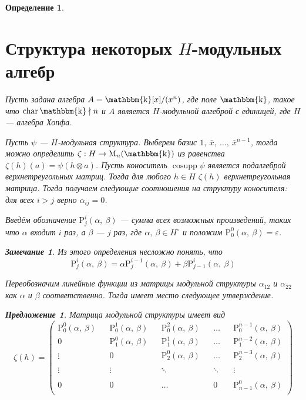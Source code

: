 \documentclass[12pt, reqno, a4paper, oneside, notitlepage]{amsart}
\theoremstyle{mytheoremstyle}
\newtheorem{proposition}[theorem]{Предложение}
\theoremstyle{myremarkstyle}
\newtheorem{remark}[theorem]{Замечание}
\newtheorem{definition}[theorem]{Определение}
\numberwithin{equation}{section}
\DeclareMathOperator{\chr}{char}
\DeclareMathOperator{\cosupp}{cosupp}
\DeclareMathOperator{\fld}{\mathbbm{k}}
\begin{document}
\begin{definition}
\newpage

\section{Структура некоторых \texorpdfstring{$H$}{H}-модульных алгебр}

Пусть задана алгебра $A = \fld[x]/(x^n)$, где поле $\fld$, такое что $\chr \fld \nmid n$ и $A$ является $H$-модульной алгеброй с единицей, где $H$ --- алгебра Хопфа.

Пусть $\psi$ --- $H$-модульная структура. Выберем базис $1,\ \bar x,\ \dots,\ \bar x^{n-1}$, тогда можно определить $\zeta: H \to \mathrm{M}_n(\fld)$ из равенства
$\zeta(h)(a) = \psi(h \otimes a)$. 
Пусть коноситель $\cosupp \psi$ является подалгеброй верхнетреугольных матриц. Тогда для любого $h \in H$ $\zeta(h)$ верхнетреугольная матрица.
Тогда получаем следующие соотношения на структуру коносителя: для всех $i > j$ верно $\alpha_{ij} = 0$.

Введём обозначение $\mathrm{P}^i_j(\alpha,\ \beta)$ --- сумма всех возможных произведений, таких что $\alpha$  входит $i$ раз, а $\beta$ --- $j$ раз, где $\alpha,\ \beta \in H^\circ$ и положим $\mathrm{P}^0_0(\alpha,\ \beta) = \varepsilon$.

\begin{remark} \label{reqursive}
  Из этого определения несложно понять, что
  \[
	\mathrm{P}^i_j(\alpha,\ \beta) = \alpha\mathrm{P}^{i-1}_j(\alpha,\ \beta)+\beta\mathrm{P}^i_{j-1}(\alpha,\ \beta)
  \]
\end{remark}

Переобозначим линейные функции из матрицы модульной структуры $\alpha_{12}$ и $\alpha_{22}$ как $\alpha$ и $\beta$ соответственно.
Тогда имеет место следующее утверждение.

\begin{proposition}
  Матрица модульной структуры имеет вид 
  \begin{equation}
	\zeta(h) = 
	\begin{pmatrix}
	  \mathrm{P}^0_0(\alpha,\ \beta) && \mathrm{P}^1_0(\alpha,\ \beta) && \mathrm{P}^2_0(\alpha,\ \beta) && \dots  && \mathrm{P}^{n-1}_0(\alpha,\ \beta) \\
	  0 && \mathrm{P}^0_1(\alpha,\ \beta) && \mathrm{P}^1_1(\alpha,\ \beta) && \dots  && \mathrm{P}^{n-2}_1(\alpha,\ \beta) \\
	  \vdots && 0 && \mathrm{P}^0_2(\alpha,\ \beta) && \dots  && \mathrm{P}^{n-3}_2(\alpha,\ \beta)\\
	  \\
	  \vdots &&  \vdots && \ddots && \ddots && \vdots \\
	  \\
	  0 && 0 && \dots && 0 && \mathrm{P}^0_{n-1}(\alpha,\ \beta) \\ \label{matrixPol}
	\end{pmatrix}
  \end{equation}
\end{proposition}


\end{definition}
\end{document}
